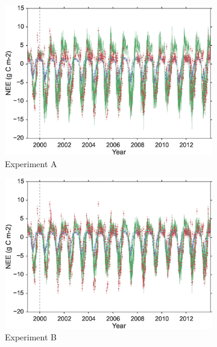 \documentclass[11pt]{article}
\begin{document}
\begin{figure}
    \centering
    \begin{subfigure}[b]{0.48\textwidth}
        \includegraphics[width=\textwidth]{A4dvar.eps}
        \caption{Experiment A}
        \label{fig:gull}
    \end{subfigure}
    \begin{subfigure}[b]{0.48\textwidth}
        \includegraphics[width=\textwidth]{B4dvar.eps}
        \caption{Experiment B}
        \label{fig:tiger}
    \end{subfigure}
    \begin{subfigure}[b]{0.48\textwidth}

\end{subfigure}
\end{figure}
\end{document}
